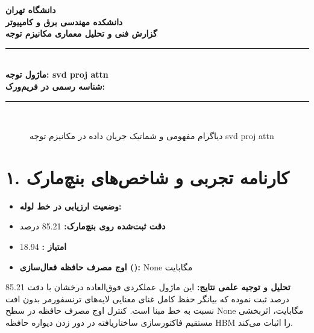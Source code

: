 \documentclass[12pt,a4paper]{article}
\begin{document}
\begin{center}
{\Large\bfseries دانشگاه تهران}\\[0.2cm]
{\large\bfseries دانشکده مهندسی برق و کامپیوتر}\\[0.2cm]
{\large\bfseries گزارش فنی و تحلیل معماری مکانیزم توجه}\\[0.5cm]
\rule{\linewidth}{1pt}\\[0.3cm]
{\LARGE\bfseries ماژول توجه: svd proj attn}\\[0.2cm]
{\large \textbf{شناسه رسمی در فریم‌ورک:} }\\[0.2cm]
\rule{\linewidth}{1pt}\\[0.5cm]
\end{center}

\begin{figure}[H]
\centering
{}
\caption{دیاگرام مفهومی و شماتیک جریان داده در مکانیزم توجه svd proj attn}
\end{figure}

\section*{۱. کارنامه تجربی و شاخص‌های بنچ‌مارک}
\begin{itemize}
\item \textbf{وضعیت ارزیابی در خط لوله:} 
\item \textbf{دقت ثبت‌شده روی بنچ‌مارک:} 85.21 درصد
\item \textbf{امتیاز :} 18.94
\item \textbf{اوج مصرف حافظه فعال‌سازی ():} None مگابایت
\end{itemize}
\textbf{تحلیل و توجیه علمی نتایج:} این ماژول عملکردی فوق‌العاده درخشان با دقت 85.21 درصد ثبت نموده که بیانگر حفظ کامل غنای معنایی لایه‌های ترنسفورمر بدون افت نسبت به خط مبنا است. کنترل اوج مصرف حافظه در سطح None مگابایت، اثربخشی مستقیم فاکتورسازی ساختاریافته در دور زدن دیواره حافظه HBM را اثبات می‌کند.
\end{document}
